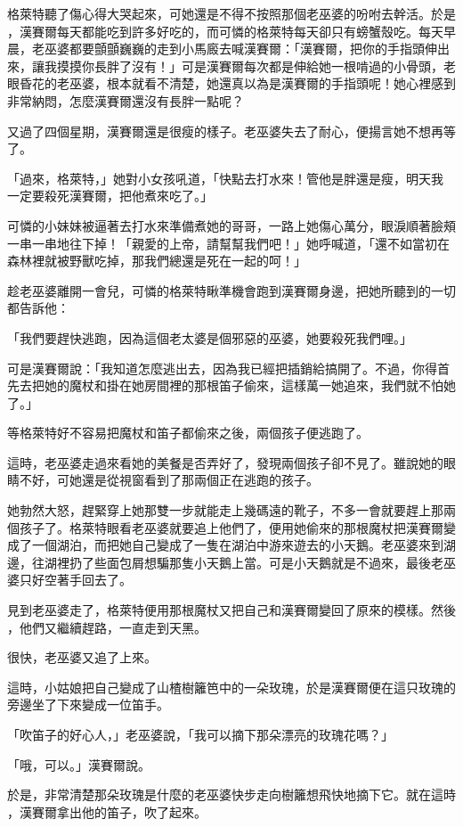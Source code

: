 \documentclass[oneside,11pt]{memoir} %
\begin{document}
格萊特聽了傷心得大哭起來，可她還是不得不按照那個老巫婆的吩咐去幹活。於是
，漢賽爾每天都能吃到許多好吃的，而可憐的格萊特每天卻只有螃蟹殼吃。每天早
晨，老巫婆都要顫顫巍巍的走到小馬廄去喊漢賽爾：「漢賽爾，把你的手指頭伸出
來，讓我摸摸你長胖了沒有！」可是漢賽爾每次都是伸給她一根啃過的小骨頭，老
眼昏花的老巫婆，根本就看不清楚，她還真以為是漢賽爾的手指頭呢！她心裡感到
非常納悶，怎麼漢賽爾還沒有長胖一點呢？

又過了四個星期，漢賽爾還是很瘦的樣子。老巫婆失去了耐心，便揚言她不想再等了。

「過來，格萊特，」她對小女孩吼道，「快點去打水來！管他是胖還是瘦，明天我
一定要殺死漢賽爾，把他煮來吃了。」

可憐的小妹妹被逼著去打水來準備煮她的哥哥，一路上她傷心萬分，眼淚順著臉頰
一串一串地往下掉！「親愛的上帝，請幫幫我們吧！」她呼喊道，「還不如當初在
森林裡就被野獸吃掉，那我們總還是死在一起的呵！」

趁老巫婆離開一會兒，可憐的格萊特瞅準機會跑到漢賽爾身邊，把她所聽到的一切
都告訴他：

「我們要趕快逃跑，因為這個老太婆是個邪惡的巫婆，她要殺死我們哩。」

可是漢賽爾說：「我知道怎麼逃出去，因為我已經把插銷給搞開了。不過，你得首
先去把她的魔杖和掛在她房間裡的那根笛子偷來，這樣萬一她追來，我們就不怕她
了。」

等格萊特好不容易把魔杖和笛子都偷來之後，兩個孩子便逃跑了。

這時，老巫婆走過來看她的美餐是否弄好了，發現兩個孩子卻不見了。雖說她的眼
睛不好，可她還是從視窗看到了那兩個正在逃跑的孩子。

她勃然大怒，趕緊穿上她那雙一步就能走上幾碼遠的靴子，不多一會就要趕上那兩
個孩子了。格萊特眼看老巫婆就要追上他們了，便用她偷來的那根魔杖把漢賽爾變
成了一個湖泊，而把她自己變成了一隻在湖泊中游來遊去的小天鵝。老巫婆來到湖
邊，往湖裡扔了些面包屑想騙那隻小天鵝上當。可是小天鵝就是不過來，最後老巫
婆只好空著手回去了。

見到老巫婆走了，格萊特便用那根魔杖又把自己和漢賽爾變回了原來的模樣。然後
，他們又繼續趕路，一直走到天黑。

很快，老巫婆又追了上來。

這時，小姑娘把自己變成了山楂樹籬笆中的一朵玫瑰，於是漢賽爾便在這只玫瑰的
旁邊坐了下來變成一位笛手。

「吹笛子的好心人，」老巫婆說，「我可以摘下那朵漂亮的玫瑰花嗎？」

「哦，可以。」漢賽爾說。

於是，非常清楚那朵玫瑰是什麼的老巫婆快步走向樹籬想飛快地摘下它。就在這時
，漢賽爾拿出他的笛子，吹了起來。
\end{document}
